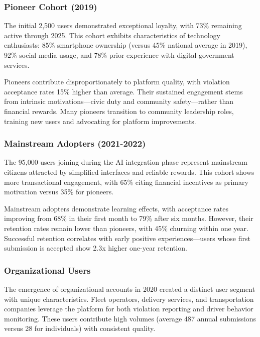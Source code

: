 \documentclass[pdflatex,sn-mathphys-num]{sn-jnl}%
\theoremstyle{thmstyleone}%
\theoremstyle{thmstyletwo}%
\theoremstyle{thmstylethree}%
\begin{document}
\subsubsection{Pioneer Cohort (2019)}

The initial 2,500 users demonstrated exceptional loyalty, with 73\% remaining active through 2025. This cohort exhibits characteristics of technology enthusiasts: 85\% smartphone ownership (versus 45\% national average in 2019), 92\% social media usage, and 78\% prior experience with digital government services.

Pioneers contribute disproportionately to platform quality, with violation acceptance rates 15\% higher than average. Their sustained engagement stems from intrinsic motivations—civic duty and community safety—rather than financial rewards. Many pioneers transition to community leadership roles, training new users and advocating for platform improvements.

\subsubsection{Mainstream Adopters (2021-2022)}

The 95,000 users joining during the AI integration phase represent mainstream citizens attracted by simplified interfaces and reliable rewards. This cohort shows more transactional engagement, with 65\% citing financial incentives as primary motivation versus 35\% for pioneers.

Mainstream adopters demonstrate learning effects, with acceptance rates improving from 68\% in their first month to 79\% after six months. However, their retention rates remain lower than pioneers, with 45\% churning within one year. Successful retention correlates with early positive experiences—users whose first submission is accepted show 2.3x higher one-year retention.

\subsubsection{Organizational Users}

The emergence of organizational accounts in 2020 created a distinct user segment with unique characteristics. Fleet operators, delivery services, and transportation companies leverage the platform for both violation reporting and driver behavior monitoring. These users contribute high volumes (average 487 annual submissions versus 28 for individuals) with consistent quality.
\end{document}
